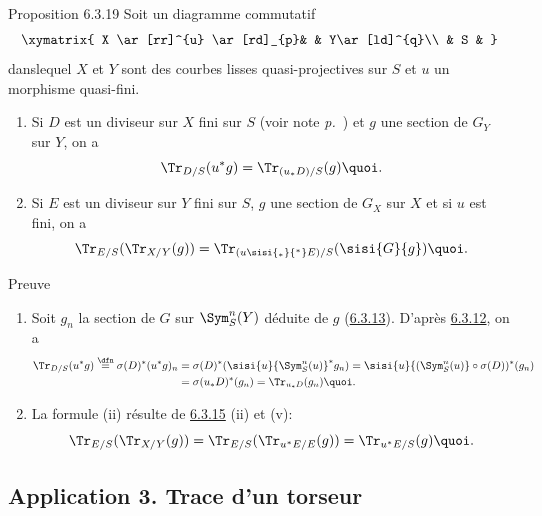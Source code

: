 \documentclass[10pt]{../fichiers-configuration-latex/smfart}
\begin{document}
\begin{enonce*}{Proposition 6.3.19}
Soit un diagramme commutatif
\[
\xymatrix{
X \ar[rr]^{u} \ar[rd]_{p}&   & Y\ar[ld]^{q}\\
  & S &
}
\]
dans\pageoriginale lequel $X$ et $Y$ sont des courbes lisses
quasi-projectives sur $S$ et $u$ un morphisme quasi-fini.
\begin{enumerate}
\renewcommand{\theenumi}{\roman{enumi}}
\renewcommand{\labelenumi}{(\theenumi)}
\item Si $D$ est un diviseur sur $X$ fini sur $S$ (voir note
\emph{p.~\pageref{XVII.note192}}) et $g$ une section de $G_{Y}$ sur $Y$, on a
\[
\Tr_{D/S}(u^{\ast}g)=\Tr_{(u_{\ast}D)/S}(g){\quoi}.
\]

\item Si $E$ est un diviseur sur $Y$ fini sur $S$, $g$ une section de
$G_{X}$ sur $X$ et si $u$ est fini, on a
\[
\Tr_{E/S}(\Tr_{X/Y}(g))=\Tr_{(u\sisi{_{\ast}}{^\ast}E)/S}(\sisi{G}{g}){\quoi}.
\]
\end{enumerate}
\end{enonce*}

\begin{enonce*}[remark]{Preuve}
\begin{enumerate}
\renewcommand{\theenumi}{\roman{enumi}}
\renewcommand{\labelenumi}{(\theenumi)}
\item Soit $g_{n}$ la section de $G$ sur $\Sym^{n}_{S}(Y)$ déduite de
$g$ (\hyperref[XVII.subsubsec6.3.13]{6.3.13}). D'après \hyperref[XVII.prop6.3.12]{6.3.12}, on a
\begin{align*}
\Tr_{D/S}(u^{\ast}g)\overset{\dfn}{=}
\sigma(D)^{\ast}(u^{\ast}g)_{n} & =\sigma(D)^{\ast}(\sisi{u}{\Sym^n_S(u)}^{\ast}g_{n})=\sisi{u}{(\Sym^n_S(u)}\circ
\sigma(D))^\ast
(g_{n})\\
& =\sigma(u_{\ast}D)^\ast(g_{n})=\Tr_{u_{\ast}D}(g_{n}){\quoi}.
\end{align*}

\item La formule (ii) résulte de \hyperref[XVII.prop6.3.15]{6.3.15} (ii) et (v):
\[
\Tr_{E/S}(\Tr_{X/Y}(g))=\Tr_{E/S}(\Tr_{u^{\ast}E/E}(g))=\Tr_{u^{\ast}E/S}(g){\quoi}.
\]
\end{enumerate}
\end{enonce*}

\subsection*{Application 3. Trace d'un torseur}
\end{document}
